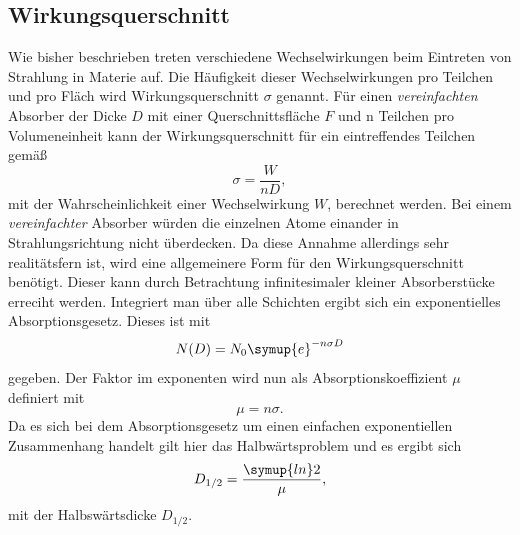 \subsection{Wirkungsquerschnitt}
\label{subsec:Wirkungsquerschnitt}
Wie bisher beschrieben treten verschiedene Wechselwirkungen beim Eintreten von Strahlung in Materie auf. Die Häufigkeit dieser Wechselwirkungen pro Teilchen und pro Fläch
wird Wirkungsquerschnitt $\sigma$ genannt. 
Für einen \textit{vereinfachten} Absorber der Dicke $D$ mit einer Querschnittsfläche $F$ und n Teilchen pro Volumeneinheit kann der Wirkungsquerschnitt für ein eintreffendes
Teilchen gemäß 
\begin{equation*}
    \sigma = \frac{W}{nD},
\end{equation*}
mit der Wahrscheinlichkeit einer Wechselwirkung $W$, berechnet werden. Bei einem \textit{vereinfachter} Absorber würden die einzelnen Atome einander in Strahlungsrichtung nicht
überdecken. Da diese Annahme allerdings sehr realitätsfern ist, wird eine allgemeinere Form für den Wirkungsquerschnitt benötigt. Dieser kann durch Betrachtung infinitesimaler
kleiner Absorberstücke erreciht werden. Integriert man über alle Schichten ergibt sich ein exponentielles Absorptionsgesetz. Dieses ist mit 
\begin{equation}
    \label{eqn:eabsorbgesetz}
    N(D) = N_0 \symup{e}^{-n\sigma D}
\end{equation}
gegeben. Der Faktor im exponenten wird nun als Absorptionskoeffizient $\mu$ definiert mit 
\begin{equation}
    \mu = n\sigma.
\end{equation}
Da es sich bei dem Absorptionsgesetz um einen einfachen exponentiellen Zusammenhang handelt gilt hier das Halbwärtsproblem und es ergibt sich 
\begin{equation}
    \label{eqn:halbswärtsdicke}
    D_{1/2} = \frac{\symup{ln}2}{\mu},
\end{equation}
mit der Halbswärtsdicke $D_{1/2}$.

